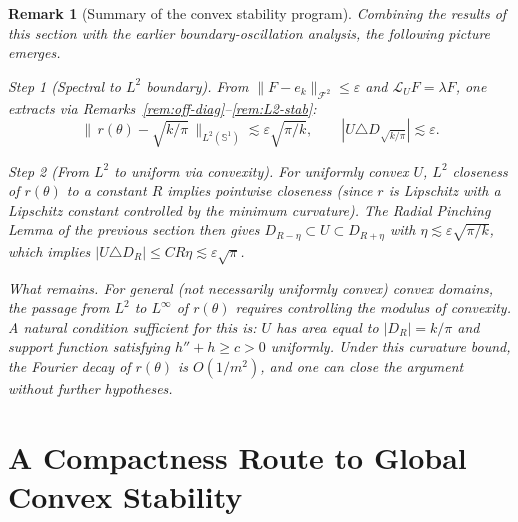 \documentclass[a4paper,11pt,reqno]{amsart}
\newtheorem{remark}{Remark}[section]
\begin{document}
\begin{remark}[Summary of the convex stability program]
Combining the results of this section with the earlier boundary-oscillation analysis,
the following picture emerges.

\emph{Step 1 (Spectral to $L^2$ boundary).}
From $\|F-e_k\|_{\mathcal{F}^2}\le\varepsilon$ and $\mathcal{L}_UF=\lambda F$, one extracts
via Remarks~\ref{rem:off-diag}--\ref{rem:L2-stab}:
\[
\|\,r(\theta)-\sqrt{k/\pi}\,\|_{L^2(\mathbb{S}^1)}\lesssim\varepsilon\sqrt{\pi/k},
\qquad|U\triangle D_{\sqrt{k/\pi}}|\lesssim\varepsilon.
\]

\emph{Step 2 (From $L^2$ to uniform via convexity).}
For uniformly convex $U$, $L^2$ closeness of $r(\theta)$ to a constant $R$ implies
pointwise closeness (since $r$ is Lipschitz with a Lipschitz constant controlled by
the minimum curvature).  The Radial Pinching Lemma of the previous section then
gives $D_{R-\eta}\subset U\subset D_{R+\eta}$ with $\eta\lesssim\varepsilon\sqrt{\pi/k}$,
which implies $|U\triangle D_R|\le C R\eta\lesssim\varepsilon\sqrt{\pi}$.

\emph{What remains.}
For general (not necessarily uniformly convex) convex domains, the passage from
$L^2$ to $L^\infty$ of $r(\theta)$ requires controlling the modulus of convexity.
A natural condition sufficient for this is: $U$ has area equal to $|D_R|=k/\pi$
and support function satisfying $h''+h\ge c>0$ uniformly.
Under this curvature bound, the Fourier decay of $r(\theta)$ is $O(1/m^2)$,
and one can close the argument without further hypotheses.
\end{remark}

\section{A Compactness Route to Global Convex Stability}
\end{document}

